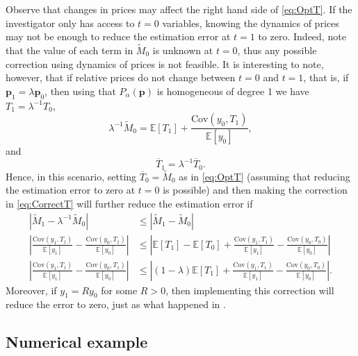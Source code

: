 \documentclass[english, a4paper,12pt]{article}
\begin{document}
Observe that changes in prices may affect the right hand side of \eqref{eq:OptT}. If the investigator only has access to $t =0$ variables, knowing the dynamics of prices may not be enough to reduce the estimation error at $t =1$ to zero. Indeed, note that the value of each term in $\tilde{M}_{0}$ is unknown at $t=0$, thus any possible correction using dynamics of prices is not feasible. It is interesting to note, however, that if relative prices do not change between $t=0$ and $t=1$, that is, if $\mathbf{p}_{1} = \lambda \mathbf{p}_{0}$, then using that $P_{\alpha}(\mathbf{p})$ is homogeneous of degree 1 we have $T_{1} = \lambda^{-1}T_{0}$,
	$$\lambda^{-1}\tilde{M}_{0} = \mathbb{E}[T_{1}] + \frac{\mathrm{Cov}\left(y_{0}, T_{1} \right)}{\mathbb{E}[y_{0}]},$$
and
	\begin{equation} \label{eq:CorrectT}
		\overline{T}_{1} = \lambda^{-1}\overline{T}_{0}.
	\end{equation}
Hence, in this scenario, setting $\overline{T}_{0} = \tilde{M}_{0}$ as in \eqref{eq:OptT} (assuming that reducing the estimation error to zero at $t=0$ is possible) and then making the correction in \eqref{eq:CorrectT} will further reduce the estimation error if
	\begin{align*}
		\left|\tilde{M}_{1} - \lambda^{-1}\tilde{M}_{0} \right|
			&\leq \left|\tilde{M}_{1} - \tilde{M}_{0} \right|	\\
		\left| \frac{\mathrm{Cov}\left(y_{1}, T_{1} \right)}{\mathbb{E}[y_{1}]} - \frac{\mathrm{Cov}\left(y_{0}, T_{1} \right)}{\mathbb{E}[y_{0}]} \right|
			&\leq \left| \mathbb{E}\left[T_{1} \right] - \mathbb{E}\left[T_{0} \right] + \frac{\mathrm{Cov}\left(y_{1}, T_{1} \right)}{\mathbb{E}[y_{1}]} - \frac{\mathrm{Cov}\left(y_{0}, T_{0} \right)}{\mathbb{E}[y_{0}]} \right|	\\
		\left| \frac{\mathrm{Cov}\left(y_{1}, T_{1} \right)}{\mathbb{E}[y_{1}]} - \frac{\mathrm{Cov}\left(y_{0}, T_{1} \right)}{\mathbb{E}[y_{0}]} \right|
			&\leq \left| (1-\lambda)\mathbb{E}\left[T_{1} \right] + \frac{\mathrm{Cov}\left(y_{1}, T_{1} \right)}{\mathbb{E}[y_{1}]} - \frac{\mathrm{Cov}\left(y_{0}, T_{0} \right)}{\mathbb{E}[y_{0}]} \right|.
	\end{align*}
Moreover, if $y_{1} = Ry_{0}$ for some $R>0$, then implementing this correction will reduce the error to zero, just as what happened in .

\subsection{Numerical example}
\end{document}
